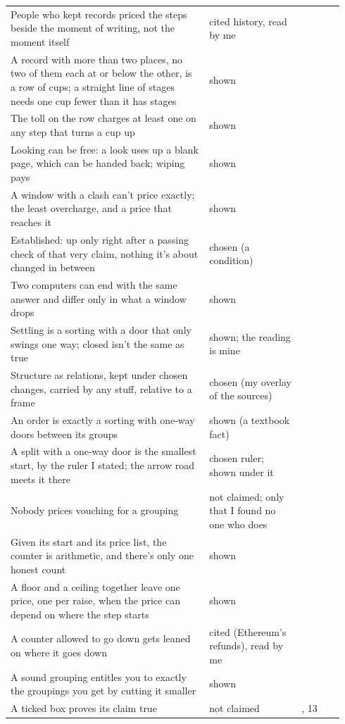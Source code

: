 \documentclass[11pt,twoside]{article}
\theoremstyle{thielethm}
\theoremstyle{thieledef}
\theoremstyle{thieledef}
\theoremstyle{thieledef}
\theoremstyle{thielethm}
\theoremstyle{thieleobs}
\theoremstyle{thielethm}
\begin{document}
\begin{longtable}{@{}>{\raggedright\arraybackslash}p{0.56\linewidth}>{\raggedright\arraybackslash}p{0.26\linewidth}>{\raggedright\arraybackslash}p{0.12\linewidth}@{}}
People who kept records priced the steps beside the moment of writing, not the moment itself & cited history, read by me & 4 \\
A record with more than two places, no two of them each at or below the other, is a row of cups; a straight line of stages needs one cup fewer than it has stages & shown & 5 \\
The toll on the row charges at least one on any step that turns a cup up & shown & 5 \\
Looking can be free: a look uses up a blank page, which can be handed back; wiping pays & shown & 6 \\
A window with a clash can't price exactly; the least overcharge, and a price that reaches it & shown & 7 \\
Established: up only right after a passing check of that very claim, nothing it's about changed in between & chosen (a condition) & 8 \\
Two computers can end with the same answer and differ only in what a window drops & shown & 8 \\
Settling is a sorting with a door that only swings one way; closed isn't the same as true & shown; the reading is mine & 9 \\
Structure as relations, kept under chosen changes, carried by any stuff, relative to a frame & chosen (my overlay of the sources) & 10 \\
An order is exactly a sorting with one-way doors between its groups & shown (a textbook fact) & 10 \\
A split with a one-way door is the smallest start, by the ruler I stated; the arrow road meets it there & chosen ruler; shown under it & 10 \\
Nobody prices vouching for a grouping & not claimed; only that I found no one who does & 10 \\
Given its start and its price list, the counter is arithmetic, and there's only one honest count & shown & 11 \\
A floor and a ceiling together leave one price, one per raise, when the price can depend on where the step starts & shown & 11 \\
A counter allowed to go down gets leaned on where it goes down & cited (Ethereum's refunds), read by me & 11 \\
A sound grouping entitles you to exactly the groupings you get by cutting it smaller & shown & 12 \\
A ticked box proves its claim true & not claimed & 12, 13 \\

\end{longtable}
\end{document}
